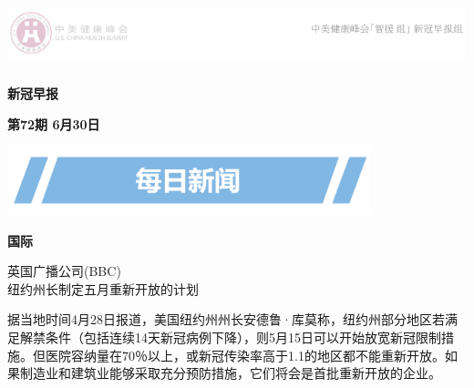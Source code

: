 \documentclass[
]{article}
\author{}
\date{\vspace{-2.5em}}
\begin{document}
\fontsize{22}{22}
\selectfont
\vspace{-10truemm}

\newcommand{\resheading}[1]{%
  \noindent\fcolorbox{lavenderblush}{lavenderblush}{\makebox[\dimexpr\textwidth-2\fboxsep-2\fboxrule][c]{\textbf{~#1}}}%
}

\begin{center}
\includegraphics[height=2cm]{./input/logo2.png} 
\end{center}

\begin{center}
\fontsize{45}{45}
\textcolor{glaucous}{\textbf{新冠早报}}
\end{center}

\begin{center}
\fontsize{22}{22}
{\textcolor{glaucous}{\textbf{第72期 \space 6月30日}}}
\end{center}

\vspace{2mm}
\begin{center}
\includegraphics[height=2cm]{./input/title1.png} 
\end{center}

\vspace{-5mm}

\begin{huge}{\textcolor{glaucous}{\textbf{国际}}}\end{huge}

\vspace{-3mm}

\begin{center}
\textcolor{glaucous}{英国广播公司(BBC)}\\纽约州长制定五月重新开放的计划

\end{center}

据当地时间4月28日报道，美国纽约州州长安德鲁·库莫称，纽约州部分地区若满足解禁条件（包括连续14天新冠病例下降），则5月15日可以开始放宽新冠限制措施。但医院容纳量在70％以上，或新冠传染率高于1.1的地区都不能重新开放。如果制造业和建筑业能够采取充分预防措施，它们将会是首批重新开放的企业。
\end{document}
